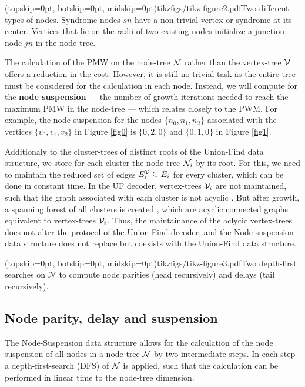 \Figure[htb](topskip=0pt, botskip=0pt, midskip=0pt){tikzfigs/tikz-figure2.pdf}{Two different types of nodes. Syndrome-nodes $sn$ have a non-trivial vertex or syndrome at its center. Vertices that lie on the radii of two existing nodes initialize a junction-node $jn$ in the node-tree.\label{fig2}}

The calculation of the PMW on the node-tree $\mathcal{N}$ rather than the vertex-tree $\mathcal{V}$ offers a reduction in the cost. However, it is still no trivial task as the entire tree must be considered for the calculation in each node. Instead, we will compute for the \textbf{node suspension} --- the number of growth iterations needed to reach the maximum PMW in the node-tree --- which relates closely to the PWM. For example, the node suspension for the nodes $\{n_0, n_1, n_2\}$ associated with the vertices $\{v_0, v_1, v_2\}$ in Figure \ref{fig0} is $\{0, 2, 0\}$ and $\{0, 1, 0\}$ in Figure \ref{fig1}.

Additionaly to the cluster-trees of distinct roots of the Union-Find data structure, we store for each cluster the node-tree $\mathcal{N}_i$ by its root. For this, we need to maintain the reduced set of edges $E^{\mathcal{V}}_i \subseteq E_i$ for every cluster, which can be done in constant time. In the UF decoder, vertex-trees $\mathcal{V}_i$ are not maintained, such that the graph associated with each cluster is not acyclic \cite{delfosse2017almost}. But after growth, a spanning forest of all clusters is created \cite{delfosse2017linear}, which are acyclic connected graphs equivalent to vertex-trees $\mathcal{V}_i$. Thus, the maintainance of the aclycic vertex-trees does not alter the protocol of the Union-Find decoder, and the Node-suspension data structure does not replace but coexists with the Union-Find data structure. 

\Figure[b](topskip=0pt, botskip=0pt, midskip=0pt){tikzfigs/tikz-figure3.pdf}{Two depth-first searches on $\mathcal{N}$ to compute node parities (head recursively) and delays (tail recursively).\label{fig3}}


\subsection{Node parity, delay and suspension}\label{sec:paritydelaysus}

The Node-Suspension data structure allows for the calculation of the node suspension of all nodes in a node-tree $\mathcal{N}$ by two intermediate steps. In each step a depth-first-search (DFS) of $\mathcal{N}$ is applied, such that the calculation can be performed in linear time to the node-tree dimension.

